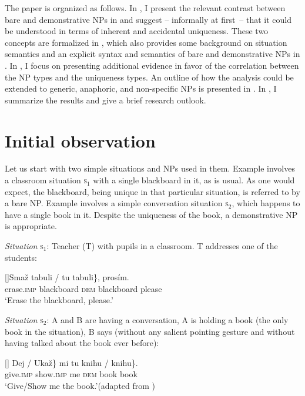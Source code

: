 \documentclass[output=paper,colorlinks,citecolor=brown,newtxmath]{langscibook}
\begin{document}
The paper is organized as follows. In , I present the relevant contrast between bare and demonstrative NPs in  and suggest -- informally at first~-- that it could be understood in terms of inherent and accidental uniqueness. These two concepts are formalized in , which also provides some background on situation semantics and an explicit syntax and semantics of bare and demonstrative NPs in . In , I focus on presenting additional evidence in favor of the correlation between the NP types and the uniqueness types. An outline of how the analysis could be extended to generic, anaphoric, and non-specific NPs is presented in . In , I summarize the results and give a brief research outlook.


\section{Initial observation}\label{simik:sec:observation}

Let us start with two simple situations and NPs used in them. Example  involves a classroom situation \textsc{s}$_1$ with a single blackboard in it, as is usual. As one would expect, the blackboard, being unique in that particular situation, is referred to by a bare NP. Example  involves a simple conversation situation \textsc{s}$_2$, which happens to have a single book in it. Despite the uniqueness of the book, a demonstrative NP is appropriate.\largerpage

\eanoraggedright \textit{Situation} \textsc{s}$_1$: Teacher (T) with pupils in a classroom. T addresses one of the students:\label{simik:ex:blackboard}
\begin{xlist}
[]{\gll Smaž \minsp{\{} tabuli / \minsp{\#} tu tabuli\}, prosím.\\
erase.\textsc{imp} {} blackboard {} {} \textsc{dem} blackboard please\\
\glt `Erase the blackboard, please.'}
\end{xlist}
\ex \textit{Situation} \textsc{s}$_2$: A and B are having a conversation, A is holding a book (the only book in the situation), B says (without any salient pointing gesture and without having talked about the book ever before):\label{simik:ex:kramsky}
\begin{xlist}
[]{\gll \minsp{\{} Dej / Ukaž\} mi \minsp{\{} tu knihu / \minsp{\#} knihu\}.\\
{} give.\textsc{imp} {} show.\textsc{imp} me {} \textsc{dem} book {} {} book\\
\glt `Give/Show me the book.'\hfill (adapted from \citealt[62]{Kramsky1972})}
\end{xlist}
\z
\end{document}

